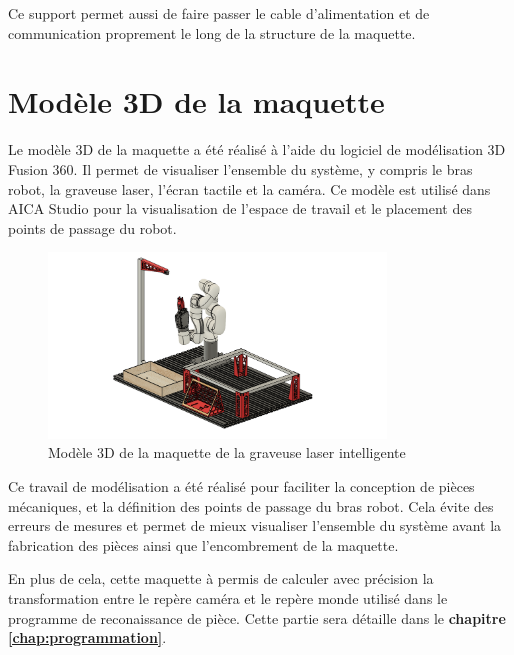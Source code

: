 Ce support permet aussi de faire passer le cable d'alimentation et de communication proprement le long de la structure de la maquette.


\section{Modèle 3D de la maquette}

Le modèle 3D de la maquette a été réalisé à l'aide du logiciel de modélisation 3D Fusion 360. Il permet de visualiser l'ensemble du système, y compris le bras robot, la graveuse laser, l'écran tactile et la caméra. Ce modèle est utilisé dans AICA Studio pour la visualisation de l'espace de travail et le placement des points de passage du robot.

\begin{figure}[H]
    \centering
    \includegraphics[width=0.8\textwidth]{assets/figures/modele_3d.png}
    \caption{Modèle 3D de la maquette de la graveuse laser intelligente}
    \label{fig:maquette_3d}
\end{figure}

Ce travail de modélisation a été réalisé pour faciliter la conception de pièces mécaniques, et la définition des points de passage du bras robot. Cela évite des erreurs de mesures et permet de mieux visualiser l'ensemble du système avant la fabrication des pièces ainsi que l'encombrement de la maquette.

En plus de cela, cette maquette à permis de calculer avec précision la transformation entre le repère caméra et le repère monde utilisé dans le programme de reconaissance de pièce. Cette partie sera détaille dans le \textbf{chapitre \ref{chap:programmation}}.
